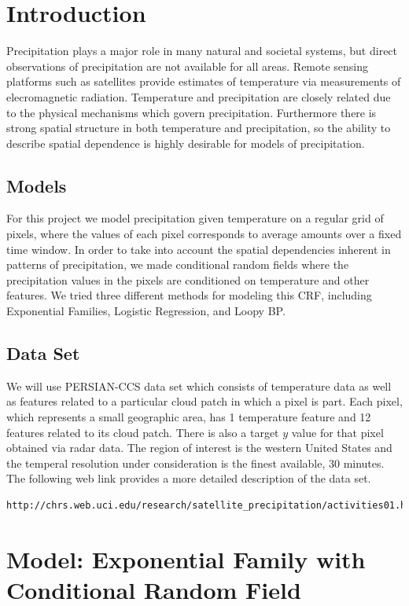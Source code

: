 
\section{Introduction}
Precipitation plays a major role in many natural and societal systems, but direct observations of precipitation are not available for all areas. Remote sensing platforms such as satellites provide estimates of temperature via measurements of elecromagnetic radiation. Temperature and precipitation are closely related due to the physical mechanisms which govern precipitation. Furthermore there is strong spatial structure in both temperature and precipitation, so the ability to describe spatial dependence is highly desirable for models of precipitation. 

\subsection{Models}

For this project we model precipitation given temperature on a regular grid of pixels, where the values of each pixel corresponds to average amounts over a fixed time window. In order to take into account the spatial dependencies inherent in patterns of precipitation, we made conditional random fields where the precipitation values in the pixels are conditioned on temperature and other features. We tried three different methods for modeling this CRF, including Exponential Families, Logistic Regression, and Loopy BP. 

\subsection{Data Set}
We will use PERSIAN-CCS data set which consists of temperature data as well as features related to a particular cloud patch in which a pixel is part. Each pixel, which represents a small geographic area, has 1 temperature feature and 12 features related to its cloud patch. There is also a target $y$ value for that pixel obtained via radar data. The region of interest is the western United States and the temperal resolution under consideration is the finest available, 30 minutes. The following web link provides a more detailed description of the data set. 

\begin{lstlisting}
http://chrs.web.uci.edu/research/satellite_precipitation/activities01.html
\end{lstlisting}

\section{Model: Exponential Family with Conditional Random Field}

